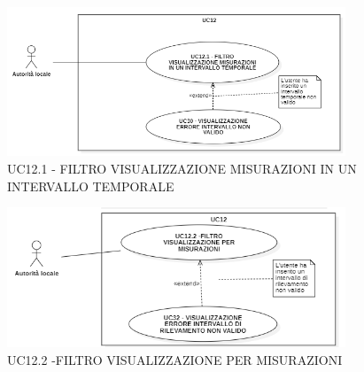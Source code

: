\begin{figure}[H]
    \centering
    \includegraphics[width=0.9\textwidth]{../Images/uc12.1.PNG}
    \caption{UC12.1 - FILTRO VISUALIZZAZIONE MISURAZIONI IN UN INTERVALLO TEMPORALE}
\end{figure}




\begin{figure}[H]
    \centering
    \includegraphics[width=0.9\textwidth]{../Images/uc12.2.PNG}
    \caption{UC12.2 -FILTRO VISUALIZZAZIONE PER MISURAZIONI}
\end{figure}



